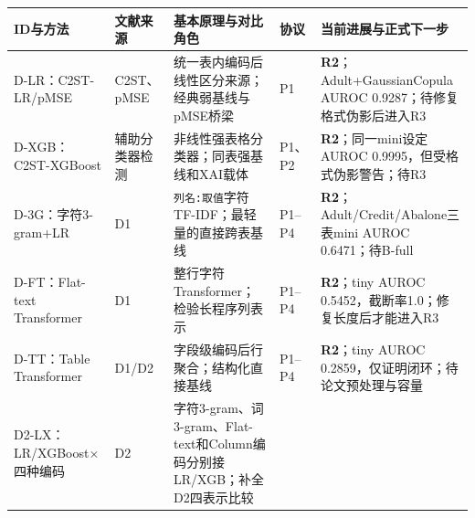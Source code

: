 \documentclass[
  chinese,
  12pt,
  a4paper,
  chinese,
  UTF8]{ctexart}
\begin{document}
\begin{longtable}[]{@{}
  >{\raggedright\arraybackslash}p{}
  >{\raggedright\arraybackslash}p{}
  >{\raggedright\arraybackslash}p{}
  >{\raggedright\arraybackslash}p{}
  >{\raggedright\arraybackslash}p{}@{}}
\toprule\noalign{}
\begin{minipage}[b]{\linewidth}\raggedright
ID与方法
\end{minipage} & \begin{minipage}[b]{\linewidth}\raggedright
文献来源
\end{minipage} & \begin{minipage}[b]{\linewidth}\raggedright
基本原理与对比角色
\end{minipage} & \begin{minipage}[b]{\linewidth}\raggedright
协议
\end{minipage} & \begin{minipage}[b]{\linewidth}\raggedright
当前进展与正式下一步
\end{minipage} \\
\midrule\noalign{}
\endhead
\bottomrule\noalign{}
\endlastfoot
D-LR：C2ST-LR/pMSE & C2ST、pMSE\autocite{lopezpaz2017c2st,snoke2018pmse}
& 统一表内编码后线性区分来源；经典弱基线与pMSE桥梁 & P1 &
\textbf{R2}；Adult+GaussianCopula AUROC
0.9287；待修复格式伪影后进入R3 \\
D-XGB：C2ST-XGBoost & 辅助分类器检测\autocite{zein2022xgb} &
非线性强表格分类器；同表强基线和XAI载体 & P1、P2 &
\textbf{R2}；同一mini设定AUROC 0.9995，但受格式伪影警告；待R3 \\
D-3G：字符3-gram+LR & D1\autocite{kindji2025cross} &
\texttt{列名:取值}字符TF-IDF；最轻量的直接跨表基线 & P1--P4 &
\textbf{R2}；Adult/Credit/Abalone三表mini AUROC 0.6471；待B-full \\
D-FT：Flat-text Transformer & D1\autocite{kindji2025cross} &
整行字符Transformer；检验长程序列表示 & P1--P4 & \textbf{R2}；tiny AUROC
0.5452，截断率1.0；修复长度后才能进入R3 \\
D-TT：Table Transformer & D1/D2\autocite{kindji2025cross,kindji2025wild}
& 字段级编码后行聚合；结构化直接基线 & P1--P4 & \textbf{R2}；tiny AUROC
0.2859，仅证明闭环；待论文预处理与容量 \\
D2-LX：LR/XGBoost×四种编码 & D2\autocite{kindji2025wild} &
字符3-gram、词3-gram、Flat-text和Column编码分别接LR/XGB；补全D2四表示比较

\end{longtable}
\end{document}
